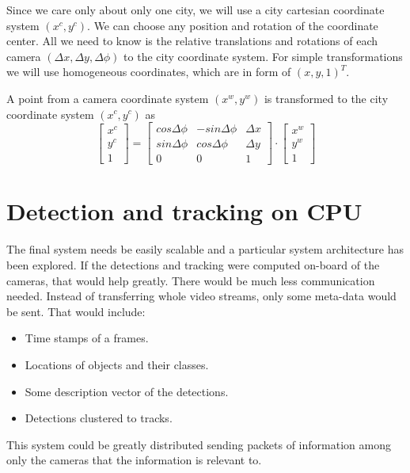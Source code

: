 \documentclass[a4paper,12pt,titlepage, twoside]{article}
\numberwithin{figure}{section}
\begin{document}
Since we care only about only one city, we will use a city cartesian coordinate system $(x^c, y^c)$. We can choose any position and rotation of the coordinate center. All we need to know is the relative translations and rotations of each camera $(\Delta x, \Delta y, \Delta\phi)$ to the city coordinate system. For simple transformations we will use homogeneous coordinates, which are in form of $(x, y, 1)^T$. 


A point from a camera coordinate system $(x^w, y^w)$ is transformed to the city coordinate system $(x^c, y^c)$ as
\[
  \begin{bmatrix}
    x^c \\
    y^c \\
    1
  \end{bmatrix}
   = 
  \begin{bmatrix}
    cos\Delta\phi & -sin\Delta\phi & \Delta x\\
    sin\Delta\phi & cos\Delta\phi & \Delta y\\
    0 & 0 & 1
  \end{bmatrix}   
  \cdot 
  \begin{bmatrix}
    x^w \\
    y^w \\
    1
  \end{bmatrix}
\]








\section{Detection and tracking on CPU}
\label{sec:classical}
The final system needs be easily scalable and a particular system architecture has been explored. If the detections and tracking were computed on-board of the cameras, that would help greatly. There would be much less communication needed. Instead of transferring whole video streams, only some meta-data would be sent. That would include: 

\begin{itemize}
\item Time stamps of a frames.
\item Locations of objects and their classes.
\item Some description vector of the detections.
\item Detections clustered to tracks.
\end{itemize}

This system could be greatly distributed sending packets of information among only the cameras that the information is relevant to.
\end{document}

